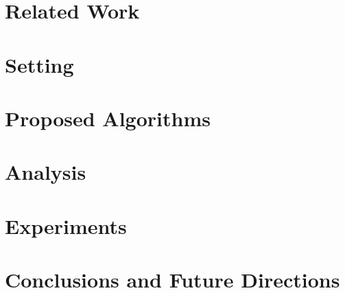 \documentclass[letterpaper]{article} %
\newcommand{\todob}[2][]{\todo[color=cyan!20,size=\tiny,inline,#1]{B: #2}} %
\begin{document}
\section{Related Work}
\label{related}


\section{Setting}
\label{probdef}



\section{Proposed Algorithms}
\label{algo}


\section{Analysis}
\label{analysis}


\section{Experiments}
\label{expt}




\section{Conclusions and Future Directions}
\label{conclusions}




\newpage




\appendix

\end{document}
